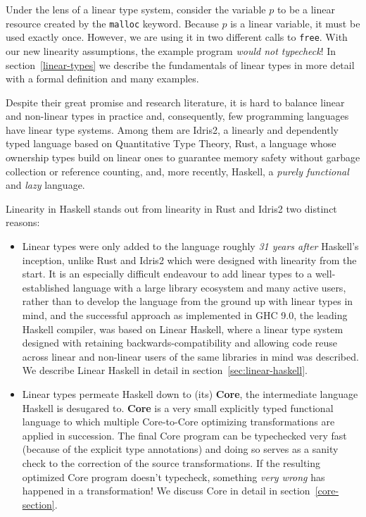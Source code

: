 \documentclass[]{lwnovathesis}
\begin{document}
Under the lens of a linear type system, consider the variable $p$ to be a linear
resource created by the \texttt{malloc} keyword. Because $p$ is a linear
variable, it must be used exactly once. However, we are using it in two
different calls to \texttt{free}. With our new linearity assumptions, the
example program \emph{would not typecheck}!  In section~\ref{linear-types} we describe the fundamentals of linear
types in more detail with a formal definition and many examples.

Despite their great promise and research literature, it is hard to balance
linear and non-linear types in practice and, consequently, few programming
languages have linear type systems. Among them are Idris2\cite{}, a linearly and
dependently typed language based on Quantitative Type Theory, Rust\cite{}, a
language whose ownership types build on linear ones to guarantee memory safety
without garbage collection or reference counting, and, more recently,
Haskell\cite{}, a \emph{purely functional} and \emph{lazy} language.

Linearity in Haskell stands out from linearity in Rust and Idris2
two distinct reasons:

\begin{itemize}
    \item Linear types were only added to the language roughly \emph{31 years
        after} Haskell's inception, unlike Rust and Idris2 which were
        designed with linearity from the start. It is an especially difficult
        endeavour to add linear types to a well-established language with a
        large library ecosystem and many active users, rather than to develop
        the language from the ground up with linear types in mind, and the
        successful approach as implemented in GHC 9.0, the leading Haskell
        compiler, was based on Linear Haskell\cite{cite:linearhaskell}, where a
        linear type system designed with retaining backwards-compatibility and
        allowing code reuse across linear and non-linear users of the same
        libraries in mind was described. We describe Linear Haskell in detail in
        section~\ref{sec:linear-haskell}.

    \item Linear types permeate Haskell down to (its) \textbf{Core}, the
        intermediate language Haskell is desugared to. \textbf{Core} is a very
        small explicitly typed functional language to which multiple
        Core-to-Core optimizing transformations are applied in succession. The
        final Core program can be typechecked very fast (because of the explicit
        type annotations) and doing so serves as a sanity check to the
        correction of the source transformations. If the resulting optimized
        Core program doesn't typecheck, something \emph{very wrong} has happened
        in a transformation!  We discuss Core in detail in
        section~\ref{core-section}.
\end{itemize}
\end{document}
